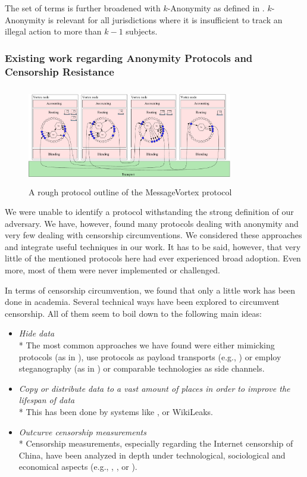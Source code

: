 \documentclass[10pt,journal,compsoc,twocolumn,twoside]{IEEEtran}
\let\MYoriglatexcaption\caption
\renewcommand{\caption}[2][\relax]{\MYoriglatexcaption[#2]{#2}}
\begin{document}
The set of terms is further broadened with $k$-Anonymity as defined in \cite{k-anonymous:ccs2003}. $k$-Anonymity is relevant for all jurisdictions where it is insufficient to track an illegal action to more than $k-1$ subjects.

\subsubsection{Existing work regarding Anonymity Protocols and Censorship Resistance}
\begin{figure}[ht]
	\centering\includegraphics[width=0.8\textwidth,height=120pt]{roughProtocolDesign}
	\caption{A rough protocol outline of the MessageVortex protocol}
	\label{fig:protocolLayers}
\end{figure}

We were unable to identify a protocol withstanding the strong definition of our adversary. We have, however, found many protocols dealing with anonymity and very few dealing with censorship circumventions. We considered these approaches and integrate useful techniques in our work. It has to be said, however, that very little of the mentioned protocols here had ever experienced broad adoption. Even more, most of them were never implemented or challenged. 

In terms of censorship circumvention, we found that only a little work has been done in academia. Several technical ways have been explored to circumvent censorship. All of them seem to boil down to the following main ideas:
\begin{itemize}
	\item \emph{Hide data}\\*
	The most common approaches we have found were either mimicking protocols (as in \cite{mohajeri2013skypemorph}), use protocols as payload transports (e.g., \cite{AthanRAM07}) or employ steganography (as in \cite{f5}) or comparable technologies as side channels.
	\item \emph{Copy or distribute data to a vast amount of places in order to improve the lifespan of data}\\*
	This has been done by systems like \cite{freenet}, or WikiLeaks.
	\item \emph{Outcurve censorship measurements}\\*
	Censorship measurements, especially regarding the Internet censorship of China, have been analyzed in depth under technological, sociological and economical aspects (e.g., \cite{Ensafi_2015}, \cite{Clayton_2006}, or \cite{lowe2007great}).
\end{itemize}
\end{document}
